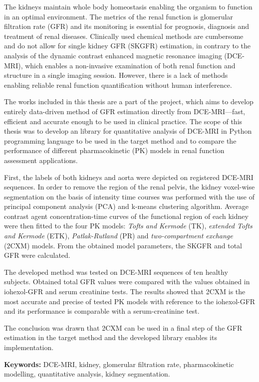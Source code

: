 	\begin{spacing}{1.0}
		\begin{small}

The kidneys maintain whole body homeostasis enabling the organism to function in an optimal environment. The metrics of the renal function is glomerular filtration rate (GFR) and its monitoring is essential for prognosis, diagnosis and treatment of renal diseases. Clinically used chemical methods are cumbersome and do not allow for single kidney GFR (SKGFR) estimation,  in contrary to the analysis of the dynamic contrast enhanced magnetic resonance imaging  (DCE-MRI), which enables a non-invasive examination of both renal function and structure in a single imaging session. However, there is a lack of methods enabling reliable renal function quantification without human interference.

The works included in this thesis are a part of the project, which aims to develop entirely data-driven method of GFR estimation directly from DCE-MRI---fast, efficient and accurate enough to be used in clinical practice. 
The scope of this thesis was to develop an library for quantitative analysis of DCE-MRI in Python programming language to be used in the target method and to compare the performance of different pharmacokinetic (PK) models in renal function assessment applications.

First, the labels of both kidneys and aorta were depicted on registered DCE-MRI sequences. In order to remove the region of the renal pelvis, the kidney voxel-wise segmentation on the basis of intensity time courses was performed with the use of principal component analysis (PCA) and k-means clustering algorithm. Average contrast agent concentration-time curves of the functional region of each kidney were then fitted to the four PK models: \textit{Tofts and Kermode} (TK), \textit{extended Tofts and Kermode} (ETK), \textit{Patlak-Rutland} (PR) and \textit{two-compartment exchange} (2CXM) models. From the obtained model parameters, the SKGFR and total GFR were calculated.   

The developed method was tested on DCE-MRI sequences of ten healthy subjects. Obtained total GFR values were compared with the values obtained in iohexol-GFR and serum creatinine tests.
The results showed that 2CXM is the most accurate and precise of tested PK models with reference to the iohexol-GFR and its performance is comparable with a serum-creatinine test. 

The conclusion was drawn that 2CXM can be used in a final step of the GFR estimation in the target method and the developed library enables its implementation.   

		
		
		\end{small}

		
		\vfill
		\normalsize \noindent \textbf{Keywords:} DCE-MRI, kidney, glomerular filtration rate, pharmacokinetic modelling, quantitative analysis, kidney segmentation.  
				
				\end{spacing}	

	\newpage
\thispagestyle{empty}
\mbox{}	

